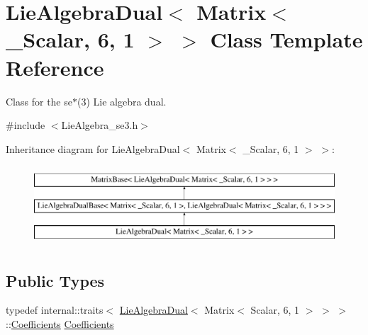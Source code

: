 \hypertarget{class_lie_algebra_dual_3_01_matrix_3_01___scalar_00_016_00_011_01_4_01_4}{}\section{Lie\+Algebra\+Dual$<$ Matrix$<$ \+\_\+\+Scalar, 6, 1 $>$ $>$ Class Template Reference}
\label{class_lie_algebra_dual_3_01_matrix_3_01___scalar_00_016_00_011_01_4_01_4}


Class for the se$\ast$(3) Lie algebra dual.  




{\ttfamily \#include $<$Lie\+Algebra\+\_\+se3.\+h$>$}

Inheritance diagram for Lie\+Algebra\+Dual$<$ Matrix$<$ \+\_\+\+Scalar, 6, 1 $>$ $>$\+:\begin{figure}[H]
\begin{center}
\leavevmode
\includegraphics[height=3.000000cm]{class_lie_algebra_dual_3_01_matrix_3_01___scalar_00_016_00_011_01_4_01_4}
\end{center}
\end{figure}
\subsection*{Public Types}
\begin{DoxyCompactItemize}
\item 
typedef internal\+::traits$<$ \hyperlink{class_lie_algebra_dual}{Lie\+Algebra\+Dual}$<$ Matrix$<$ Scalar, 6, 1 $>$ $>$ $>$\+::\hyperlink{class_lie_algebra_dual_3_01_matrix_3_01___scalar_00_016_00_011_01_4_01_4_ae22cd667e4ac77db27cc018db14003bd}{Coefficients} \hyperlink{class_lie_algebra_dual_3_01_matrix_3_01___scalar_00_016_00_011_01_4_01_4_ae22cd667e4ac77db27cc018db14003bd}{Coefficients}
\end{DoxyCompactItemize}
